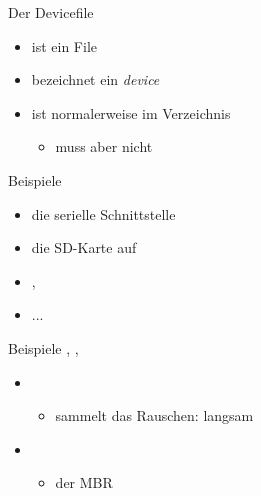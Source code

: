 \begin{frame}{Der Devicefile }
 \begin{itemize}
  \item ist ein File
  \item bezeichnet ein {\em device}
  \item ist normalerweise im Verzeichnis 
  \begin{itemize}
   \item muss aber nicht 
  \end{itemize}
 \end{itemize}
 \begin{block}{Beispiele}
  \begin{itemize}
   \item {} die serielle Schnittstelle
   \item {} die SD-Karte auf \target
   \item {}, 
   \item ...
  \end{itemize}
 \end{block}
\end{frame}

\begin{frame}{Beispiele}
{, 
, }
 \begin{itemize}
  \item {} 
  \begin{itemize}
    \item sammelt das Rauschen: langsam
   \end{itemize}
  \item {}
  \begin{itemize} 
    \item der MBR 
  \end{itemize}  
 \end{itemize}
\end{frame}


